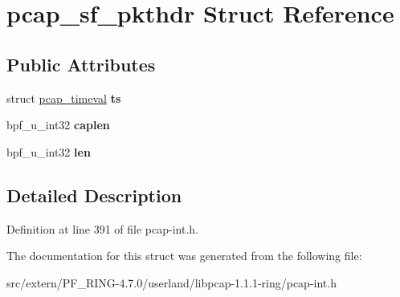 \hypertarget{structpcap__sf__pkthdr}{
\section{pcap\_\-sf\_\-pkthdr Struct Reference}
\label{structpcap__sf__pkthdr}
}
\subsection*{Public Attributes}
\begin{DoxyCompactItemize}
\item 
\hypertarget{structpcap__sf__pkthdr_a270cbdd15d2fb8f77e046843ce40d270}{
struct \hyperlink{structpcap__timeval}{pcap\_\-timeval} {\bfseries ts}}
\label{structpcap__sf__pkthdr_a270cbdd15d2fb8f77e046843ce40d270}

\item 
\hypertarget{structpcap__sf__pkthdr_aad3d821c713f46af739cd00c2eca4060}{
bpf\_\-u\_\-int32 {\bfseries caplen}}
\label{structpcap__sf__pkthdr_aad3d821c713f46af739cd00c2eca4060}

\item 
\hypertarget{structpcap__sf__pkthdr_a76b309d374c9afa16844ce1fb7647a3b}{
bpf\_\-u\_\-int32 {\bfseries len}}
\label{structpcap__sf__pkthdr_a76b309d374c9afa16844ce1fb7647a3b}

\end{DoxyCompactItemize}


\subsection{Detailed Description}


Definition at line 391 of file pcap-\/int.h.



The documentation for this struct was generated from the following file:\begin{DoxyCompactItemize}
\item 
src/extern/PF\_\-RING-\/4.7.0/userland/libpcap-\/1.1.1-\/ring/pcap-\/int.h\end{DoxyCompactItemize}

